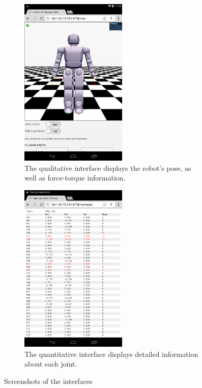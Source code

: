 \documentclass[letterpaper, 10 pt, conference]{ieee/ieeeconf}  %
\begin{document}
\begin{figure}[ptb]
    \centering
    \begin{subfigure}[b]{2.5in}
        \centering
        \includegraphics[width=2in]{figures/QualitativePortrait.png}
        \caption{The qualitative interface displays the robot's pose, as well as force-torque information.}
        \label{fig:Qualitative}
    \end{subfigure}%
    \quad
    \begin{subfigure}[b]{2.5in}
        \centering
        \includegraphics[width=2in]{figures/QuantitativePortrait.png}
        \caption{The quantitative interface displays detailed information about each joint. }
        \label{fig:Quantitative}
    \end{subfigure}%
    \caption{Screenshots of the interfaces}
    \label{fig:Screenshots}
\end{figure}
\end{document}
